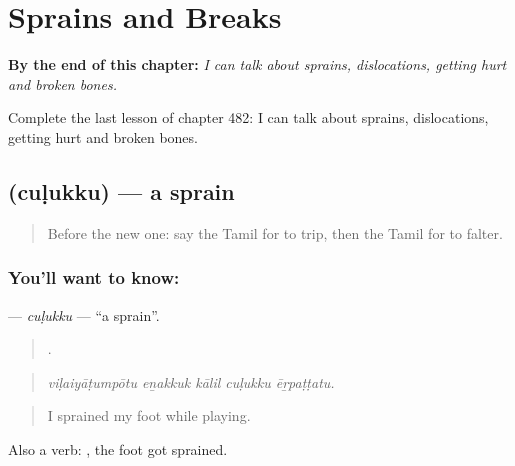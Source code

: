 
\chapter{Sprains and Breaks}
\label{ch:ta-sprains-and-breaks}

\begin{chapteropening}
\textbf{By the end of this chapter:} \emph{I can talk about sprains, dislocations, getting hurt and broken bones.}

Complete the last lesson of chapter 482: I can talk about sprains, dislocations, getting hurt and broken bones.
\end{chapteropening}

\section[\texorpdfstring{\ta{சுளுக்கு} (cuḷukku)}{சுளுக்கு (cuḷukku)}]{ (cuḷukku) — a sprain}

\label{lesson:TA-C482-culukku}



\begin{quote}
Before the new one: say the Tamil for to trip, then the Tamil for to falter.
\end{quote}

\subsection*{You'll want to know: }
\textbf{} — \emph{cuḷukku} — \textquotedblleft{}a sprain\textquotedblright{}.

\begin{quote}
    .
\end{quote}

\begin{quote}
\emph{viḷaiyāṭumpōtu eṉakkuk kālil cuḷukku ēṟpaṭṭatu.}
\end{quote}

\begin{quote}
I sprained my foot while playing.
\end{quote}

Also a verb:  , the foot got sprained.

